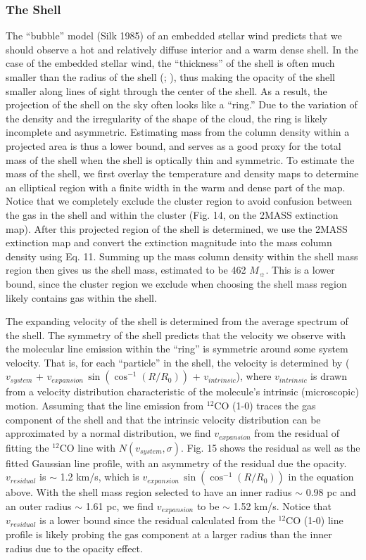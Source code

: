 \documentclass[11pt,a4paper]{emulateapj}
\begin{document}
\subsubsection{The Shell}
The ``bubble'' model (Silk 1985) of an embedded stellar wind predicts that we should observe a hot and relatively diffuse interior and a warm dense shell. In the case of the embedded stellar wind, the ``thickness'' of the shell is often much smaller than the radius of the shell (\citet{Churchwell_2007}; \citet{Arce_2011}), thus making the opacity of the shell smaller along lines of sight through the center of the shell. As a result, the projection of the shell on the sky often looks like a ``ring.'' Due to the variation of the density and the irregularity of the shape of the cloud, the ring is likely incomplete and asymmetric. Estimating mass from the column density within a projected area is thus a lower bound, and serves as a good proxy for the total mass of the shell when the shell is optically thin and symmetric. To estimate the mass of the shell, we first overlay the temperature and density maps to determine an elliptical region with a finite width in the warm and dense part of the map. Notice that we completely exclude the cluster region to avoid confusion between the gas in the shell and within the cluster (Fig. 14, on the 2MASS extinction map). After this projected region of the shell is determined, we use the 2MASS extinction map and convert the extinction magnitude into the mass column density using Eq. 11. Summing up the mass column density within the shell mass region then gives us the shell mass, estimated to be 462 $M_{\sun}$. This is a lower bound, since the cluster region we exclude when choosing the shell mass region likely contains gas within the shell.

The expanding velocity of the shell is determined from the average spectrum of the shell. The symmetry of the shell predicts that the velocity we observe with the molecular line emission within the ``ring'' is symmetric around some system velocity. That is, for each ``particle'' in the shell, the velocity is determined by ($v_{system}$ + $v_{expansion}\,\sin{\left(\cos^{-1}{\left(R/R_0\right)}\right)}$ + $v_{intrinsic}$), where $v_{intrinsic}$ is drawn from a velocity distribution characteristic of the molecule's intrinsic (microscopic) motion. Assuming that the line emission from $^{12}$CO (1-0) traces the gas component of the shell and that the intrinsic velocity distribution can be approximated by a normal distribution, we find $v_{expansion}$ from the residual of fitting the $^{12}$CO line with $N(v_{system}, \sigma)$. Fig. 15 shows the residual as well as the fitted Gaussian line profile, with an asymmetry of the residual due the opacity. $v_{residual}$ is $\sim$ 1.2 km/s, which is $v_{expansion}\,\sin{\left(\cos^{-1}{\left(R/R_0\right)}\right)}$ in the equation above. With the shell mass region selected to have an inner radius $\sim$ 0.98 pc and an outer radius $\sim$ 1.61 pc, we find $v_{expansion}$ to be $\sim$ 1.52 km/s. Notice that $v_{residual}$ is a lower bound since the residual calculated from the $^{12}$CO (1-0) line profile is likely probing the gas component at a larger radius than the inner radius due to the opacity effect.
\end{document}
